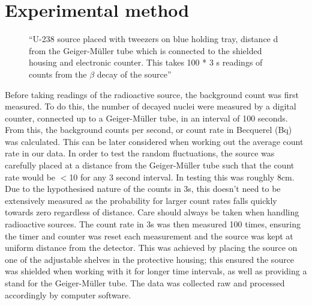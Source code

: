 \documentclass[11pt]{article}
\begin{document}
    \section{Experimental method}


    \begin{figure}[ht]
        \begin{center}
            \def\svgwidth{\columnwidth}
            
             \caption{“U-238 source placed with tweezers on blue holding tray, distance d from the Geiger-Müller tube which is connected to the shielded housing and electronic counter. This takes 100 * 3 s readings of counts from the $\beta$ decay of the source”}
             \label{fig:experimental setup}
        \end{center}
    \end{figure}

    Before taking readings of the radioactive source, the background count was first measured. To do this, the number of decayed nuclei were measured by a digital counter, connected up to a Geiger-Müller tube, in an interval of 100 seconds. From this, the background counts per second, or count rate in Becquerel (Bq) was calculated. This can be later considered when working out the average count rate in our data. 
    \newline
    In order to test the random fluctuations, the  source was carefully placed at a distance from the Geiger-Müller tube such that the count rate would be $<$10 for any 3 second interval. In testing this was roughly 8cm. Due to the hypothesised nature of the counts in 3s, this doesn't need to be extensively measured as the probability for larger count rates falls quickly towards zero regardless of distance. Care should always be taken when handling radioactive sources. 
    \newline
    The count rate in 3s was then measured 100 times, ensuring the timer and counter was reset each measurement and the source was kept at uniform distance from the detector. This was achieved by placing the source on one of the adjustable shelves in the protective housing; this ensured the source was shielded when working with it for longer time intervals, as well as providing a stand for the Geiger-Müller tube. The data was collected raw and processed accordingly by computer software. 
    \newline 
    
\end{document}
